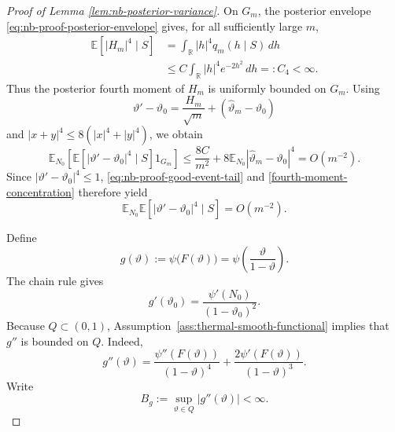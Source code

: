 \documentclass{article}
\theoremstyle{named}
\theoremstyle{named1}
\theoremstyle{plain}
\theoremstyle{remark}
\begin{document}
\begin{proof}[Proof of Lemma \ref{lem:nb-posterior-variance}]
On \(G_m\), the posterior envelope
\eqref{eq:nb-proof-posterior-envelope} gives, for all sufficiently
large \(m\),
\[
\begin{aligned}
    \mathbb E\!\left[|H_m|^4\mid S\right]
    &=
    \int_{\mathbb R}|h|^4 q_m(h\mid S)\,dh \\
    &\leq
    C\int_{\mathbb R}|h|^4e^{-2h^2}\,dh
    =:C_4<\infty.
\end{aligned}
\]
Thus the posterior fourth moment of \(H_m\) is uniformly bounded on
\(G_m\).
Using
\[
    \vartheta'-\vartheta_0
    =
    \frac{H_m}{\sqrt m}
    +
    (\widehat\vartheta_m-\vartheta_0)
\]
and \(|x+y|^4\leq8(|x|^4+|y|^4)\), we obtain
\begin{equation}
    \mathbb E_{N_0}
    \left[
        \mathbb E[
            |\vartheta'-\vartheta_0|^4
            \mid S
        ]1_{G_m}
    \right]
\leq
    \frac{8C}{m^2}
    +
    8\mathbb E_{N_0}
    |\widehat\vartheta_m-\vartheta_0|^4
    =
    O(m^{-2}). \label{fourth-moment-concentration}
\end{equation}
Since $|\vartheta'-\vartheta_0|^4\leq1$, \eqref{eq:nb-proof-good-event-tail} and \eqref{fourth-moment-concentration} therefore yield
\begin{equation}
    \mathbb E_{N_0}
    \mathbb E[
        |\vartheta'-\vartheta_0|^4
        \mid S
    ]
    =
    O(m^{-2}).
    \label{eq:nb-proof-posterior-fourth-moment}
\end{equation}


Define
\[
    g(\vartheta)
    :=
    \psi\bigl(F(\vartheta)\bigr)
    =
    \psi\left(\frac{\vartheta}{1-\vartheta}\right).
\]
The chain rule gives
\begin{equation}
    g'(\vartheta_0)
    =
    \frac{\psi'(N_0)}
         {(1-\vartheta_0)^2}.
    \label{eq:nb-proof-functional-derivative}
\end{equation}
Because \(Q\subset(0,1)\), Assumption~\ref{ass:thermal-smooth-functional} implies that \(g''\)
is bounded on \(Q\). Indeed,
\[
    g''(\vartheta)
    =
    \frac{\psi''(F(\vartheta))}
         {(1-\vartheta)^4}
    +
    \frac{2\psi'(F(\vartheta))}
         {(1-\vartheta)^3}.
\]
Write
\[
    B_g:=\sup_{\vartheta\in Q}|g''(\vartheta)|<\infty.
\]


\end{proof}
\end{document}
